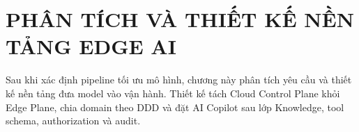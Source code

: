 \chapter{PHÂN TÍCH VÀ THIẾT KẾ NỀN TẢNG EDGE AI}

Sau khi xác định pipeline tối ưu mô hình, chương này phân tích yêu cầu và thiết
kế nền tảng đưa model vào vận hành. Thiết kế tách Cloud Control Plane khỏi Edge
Plane, chia domain theo DDD và đặt AI Copilot sau lớp Knowledge, tool schema,
authorization và audit.










